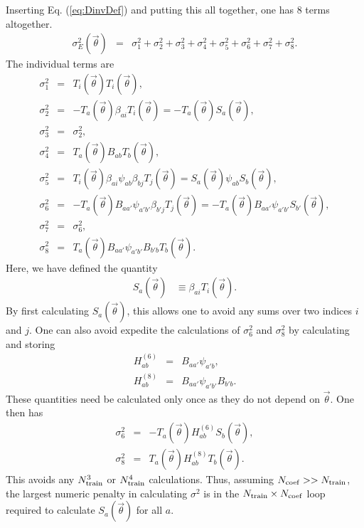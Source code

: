 \documentclass[UserManual.tex]{subfiles}
\begin{document}
Inserting Eq. (\ref{eq:DinvDef}) and putting this all together, one has 8 terms altogether.
\begin{eqnarray}
\sigma_E^2(\vec{\theta})&=&
\sigma^2_1+\sigma_2^2+\sigma^2_3+\sigma^2_4+\sigma^2_5+\sigma_6^2+\sigma^2_7+\sigma^2_8.
\end{eqnarray}
The individual terms are
\begin{eqnarray}
\sigma_1^2&=&T_i(\vec{\theta})T_i(\vec{\theta}),\\
\nonumber
\sigma_2^2&=&-T_a(\vec{\theta})\beta_{ai}T_i(\vec{\theta})=-T_a(\vec{\theta})S_a(\vec{\theta}),\\
\nonumber
\sigma_3^2&=&\sigma_2^2,\\
\nonumber
\sigma_4^2&=&T_a(\vec{\theta})B_{ab}T_b(\vec{\theta}),\\
\nonumber
\sigma_5^2&=&T_i(\vec{\theta})\beta_{ai}\psi_{ab}\beta_{bj}T_j(\vec{\theta})=S_a(\vec{\theta})\psi_{ab}S_b(\vec{\theta}),\\
\nonumber
\sigma_6^2&=&-T_a(\vec{\theta})B_{aa'}\psi_{a'b'}\beta_{b'j}T_j(\vec{\theta})=-T_a(\vec{\theta})B_{aa'}\psi_{a'b'}S_{b'}(\vec{\theta}),\\
\nonumber
\sigma_7^2&=&\sigma_6^2,\\
\nonumber
\sigma_8^2&=&T_a(\vec{\theta})B_{aa'}\psi_{a'b'}B_{b'b}T_b(\vec{\theta}).
\end{eqnarray}
Here, we have defined the quantity 
\begin{eqnarray}
S_a(\vec{\theta})&\equiv \beta_{ai}T_i(\vec{\theta}).
\end{eqnarray}
By first calculating $S_a(\vec{\theta})$, this allows one to avoid any sums over two indices $i$ and $j$. One can also avoid expedite the calculations of $\sigma_6^2$ and $\sigma_8^2$ by calculating and storing
\begin{eqnarray}
H^{(6)}_{ab}&=&B_{aa'}\psi_{a'b},\\
H^{(8)}_{ab}&=&B_{aa'}\psi_{a'b'}B_{b'b}.
\end{eqnarray}
These quantities need be calculated only once as they do not depend on $\vec{\theta}$. One then has
\begin{eqnarray}
\sigma_6^2&=&-T_{a}(\vec{\theta})H^{(6)}_{ab}S_b(\vec{\theta}),\\
\sigma_8^2&=&T_a(\vec{\theta})H^{(8)}_{ab}T_b(\vec{\theta}).
\end{eqnarray}
This avoids any $N_{\rm train}^3$ or $N_{\rm train}^4$ calculations. Thus, assuming $N_{\rm coef}>>N_{\rm train}$, the largest numeric penalty in calculating $\sigma^2$ is in the $N_{\rm train}\times N_{\rm coef}$ loop required to calculate $S_a(\vec{\theta})$ for all $a$. 
\end{document}
